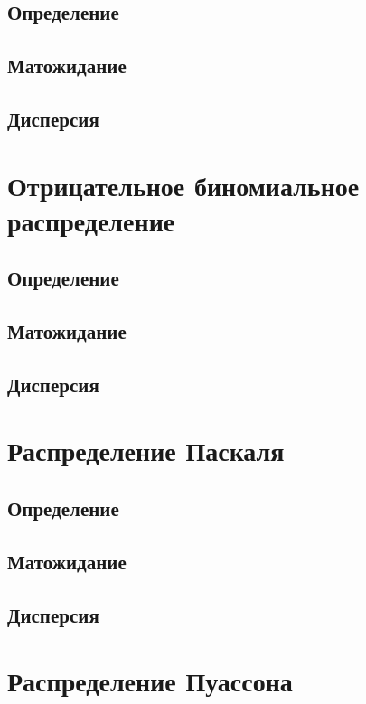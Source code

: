 \subsection{Определение}

\subsection{Матожидание}

\subsection{Дисперсия}

\section{Отрицательное биномиальное распределение}

\subsection{Определение}

\subsection{Матожидание}

\subsection{Дисперсия}

\section{Распределение Паскаля}

\subsection{Определение}

\subsection{Матожидание}

\subsection{Дисперсия}

\section{Распределение Пуассона}


